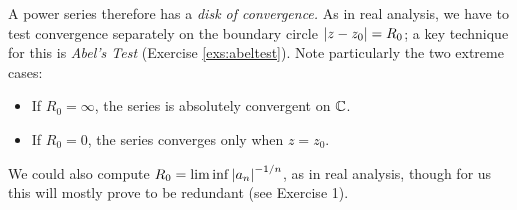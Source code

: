 A power series therefore has a \emph{disk of convergence.} As in real analysis, we have to test convergence separately on the boundary circle $\left| z-z_0\right|=R_0$; a key technique for this is \emph{Abel's Test} (Exercise \ref{exs:abeltest}). Note particularly the two extreme cases:
\begin{itemize}%
	\item If $R_0=\infty$, the series is absolutely convergent on $\mathbb{C}$.
	\item If $R_0=0$, the series converges only when $z=z_0$.
\end{itemize}
We could also compute $R_0=\liminf\left| a_n\right|^{-1/n}$, as in real analysis, though for us this will mostly prove to be redundant (see Exercise 1). %

